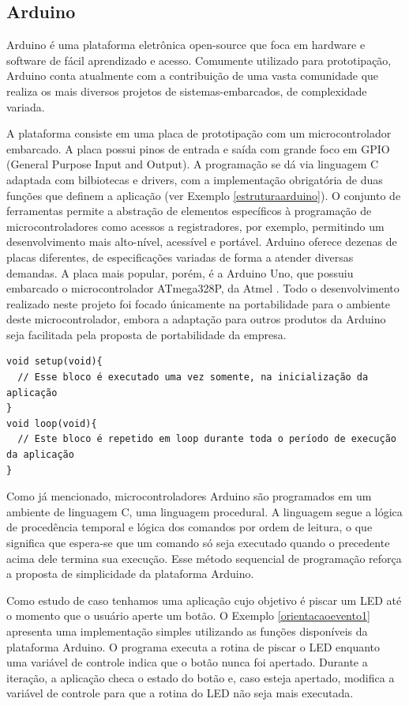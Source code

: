 \documentclass[11pt]{article}
\begin{document}
\subsection{Arduino}
\tab Arduino é uma plataforma eletrônica open-source que foca em hardware e software de fácil aprendizado e acesso. Comumente utilizado para prototipação, Arduino conta atualmente com a contribuição de uma vasta comunidade que realiza os mais diversos projetos de sistemas-embarcados, de complexidade variada. \cite{arduinoblog}
\par A plataforma consiste em uma placa de prototipação com um microcontrolador embarcado. A placa possui pinos de entrada e saída com grande foco em GPIO (General Purpose Input and Output). A programação se dá via linguagem C adaptada com bilbiotecas e drivers, com a implementação obrigatória de duas funções que definem a aplicação (ver Exemplo \ref{estruturaarduino}). O conjunto de ferramentas permite a abstração de elementos específicos à programação de microcontroladores como acessos a registradores, por exemplo, permitindo um desenvolvimento mais alto-nível, acessível e portável. Arduino oferece dezenas de placas diferentes, de especificações variadas de forma a atender diversas demandas. A placa mais popular, porém, é a Arduino Uno, que possuiu embarcado o microcontrolador ATmega328P, da Atmel \cite{atmegadatasheet}. Todo o desenvolvimento realizado neste projeto foi focado únicamente na portabilidade para o ambiente deste microcontrolador, embora a adaptação para outros produtos da Arduino seja facilitada pela proposta de portabilidade da empresa.
\begin{lstlisting}[style=CStyle,label=estruturaarduino,caption=Estrutura de uma aplicação Arduino]
void setup(void){
  // Esse bloco é executado uma vez somente, na inicialização da aplicação
}
void loop(void){
  // Este bloco é repetido em loop durante toda o período de execução da aplicação
}
\end{lstlisting}
\par Como já mencionado, microcontroladores Arduino são programados em um ambiente de linguagem C, uma linguagem procedural. A linguagem segue a lógica de procedência temporal e lógica dos comandos por ordem de leitura, o que significa que espera-se que um comando só seja executado quando o precedente acima dele termina sua execução. Esse método sequencial de programação reforça a proposta de simplicidade da plataforma Arduino. 
\par Como estudo de caso tenhamos uma aplicação cujo objetivo é piscar um LED até o momento que o usuário aperte um botão. O Exemplo \ref{orientacaoevento1} apresenta uma implementação simples utilizando as funções disponíveis da plataforma Arduino. O programa executa a rotina de piscar o LED enquanto uma variável de controle indica que o botão nunca foi apertado. Durante a iteração, a aplicação checa o estado do botão e, caso esteja apertado, modifica a variável de controle para que a rotina do LED não seja mais executada.
\end{document}
